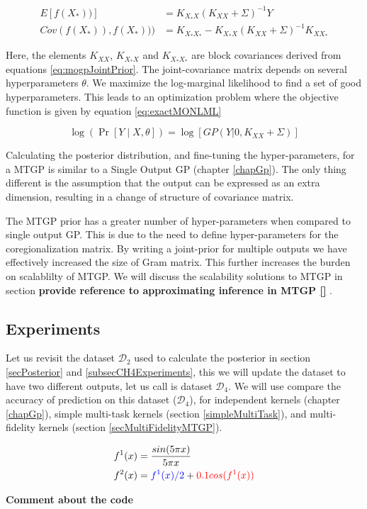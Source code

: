 \begin{align}
  E[f(X_{*}))] & = K_{X_{*}X}\left ( K_{XX} + \Sigma \right )^{-1}Y \label{eq:predictiveMOMean} \\ 
  Cov(f(X_{*})), f(X_{*}))) & = K_{X_{*}X_{*}} - K_{X_{*}X}\left ( K_{XX} + \Sigma \right )^{-1}K_{XX_{*}} \label{eq:predictiveMOCovariance}
\end{align}
  
Here, the elements \(K_{XX}\), \(K_{X_{*}X}\) and \(K_{X_{*}X_{*}}\) are block covariances derived from equations \ref{eq:mogpJointPrior}. The joint-covariance matrix depends on several hyperparameters \(\theta\). We maximize the log-marginal likelihood to find a set of good hyperparameters. This leads to an optimization problem where the objective function is given by equation \ref{eq:exactMONLML} 
  
  \begin{equation}\label{eq:exactMONLML}
\log(\Pr[Y \mid X, \theta]) = \log[GP(Y| 0, K_{XX} + \Sigma )]
  \end{equation}
  
Calculating the posterior distribution, and fine-tuning the hyper-parameters, for a MTGP is similar to a Single Output GP (chapter \ref{chapGp}). The only thing different is the assumption that the output can be expressed as an extra dimension, resulting in a change of structure of covariance matrix. 

The MTGP prior has a greater number of hyper-parameters when compared to single output GP. This is due to the need to define hyper-parameters for the coregionalization matrix. By writing a joint-prior for multiple outputs we have effectively increased the size of Gram matrix. This further increases the burden on scalablilty of MTGP. We will discuss the scalability solutions to MTGP in section \textbf{provide reference to approximating inference in MTGP \ref{} }. 

\subsection{Experiments}\label{subsecCh6Experiments}
\begin{mdframed}[hidealllines=true,backgroundcolor=lightgray!20]
Let us revisit the dataset $\mathcal{D}_{2}$ used to calculate the posterior in section \ref{secPosterior} and \ref{subsecCH4Experiments}, this we will update the dataset to have two different outputs, let us call is dataset $\mathcal{D}_{4}$. We will use compare the accuracy of prediction on this dataset ($\mathcal{D}_{4}$), for independent kernels (chapter \ref{chapGp}), simple multi-task kernels (section \ref{simpleMultiTask}), and multi-fidelity kernels (section \ref{secMultiFidelityMTGP}). 

\begin{align}\label{eqFunctionForD4}
f^{1}(x) & = \frac{sin(5 \pi x)}{5 \pi x} \\
f^{2}(x) & = \textcolor{blue}{f^{1}(x)/2} +\textcolor{red}{0.1cos(f^{1}(x))}
\end{align}


\textbf{Comment about the code}

\end{mdframed}

